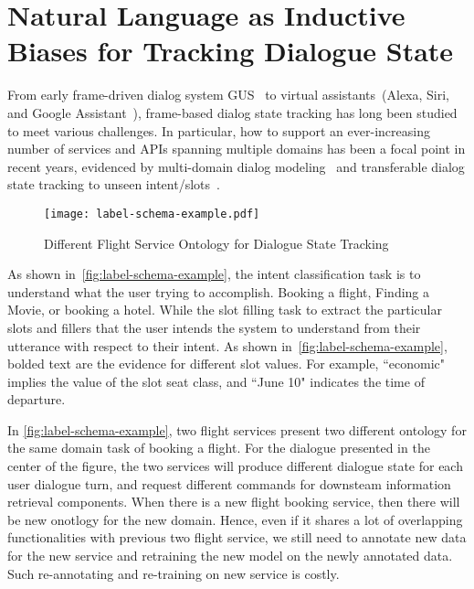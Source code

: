 \chapter{Natural Language as Inductive Biases for Tracking Dialogue State}
\label{chap:sgd}

From early frame-driven dialog system GUS~\citep{bobrow1977gus} to
virtual assistants~(Alexa, Siri, and Google Assistant~\etal),
frame-based dialog state tracking has long been studied to meet
various challenges. In particular, how to support an ever-increasing
number of services and APIs spanning multiple domains has been a focal
point in recent years, evidenced by multi-domain dialog
modeling~\citep{budzianowski2018multiwoz,byrne2019taskmaster,
  shah-etal-2018-bootstrapping} and transferable dialog state tracking
to unseen intent/slots~\cite{mrkvsic2017neural,
  wu2019transferable, hosseini2020simple}.

\begin{figure}[!th]
\centering
\texttt{[image: label-schema-example.pdf]}
\caption{\label{fig:label-schema-example} Different Flight Service
  Ontology for Dialogue State Tracking}
\end{figure}

As shown in~\autoref{fig:label-schema-example}, the intent
classification task is to understand what the user trying to
accomplish. Booking a flight, Finding a Movie, or booking a
hotel. While the slot filling task to extract the particular slots and
fillers that the user intends the system to understand from their
utterance with respect to their intent. As shown
in~\autoref{fig:label-schema-example}, bolded text are the evidence
for different slot values. For example, ``economic" implies the value
of the slot seat class, and ``June 10" indicates the time of
departure.

In \autoref{fig:label-schema-example}, two flight services present two
different ontology for the same domain task of booking a flight. For
the dialogue presented in the center of the figure, the two services
will produce different dialogue state for each user dialogue turn, and
request different commands for downsteam information retrieval
components. When there is a new flight booking service, then there
will be new onotlogy for the new domain. Hence, even if it shares a
lot of overlapping functionalities with previous two flight service,
we still need to annotate new data for the new service and retraining
the new model on the newly annotated data. Such re-annotating and
re-training on new service is costly.

